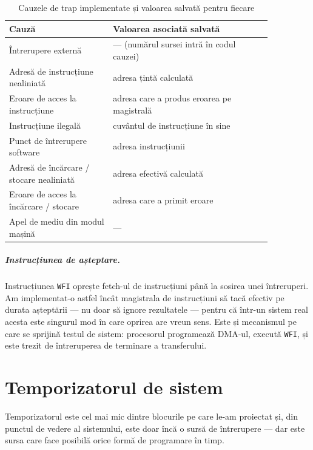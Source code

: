 \documentclass[11pt,openany]{report}
\newcommand{\sig}[1]{\texttt{#1}}
\begin{document}
\begin{table}[H]
\centering
\caption{Cauzele de trap implementate și valoarea salvată pentru fiecare}
\label{tab:trapcauses}
\small
\begin{tabular}{@{}L{0.34\linewidth}L{0.52\linewidth}@{}}
\toprule
\textbf{Cauză} & \textbf{Valoarea asociată salvată} \\
\midrule
Întrerupere externă & --- (numărul sursei intră în codul cauzei) \\
Adresă de instrucțiune nealiniată & adresa țintă calculată \\
Eroare de acces la instrucțiune & adresa care a produs eroarea pe magistrală \\
Instrucțiune ilegală & cuvântul de instrucțiune în sine \\
Punct de întrerupere software & adresa instrucțiunii \\
Adresă de încărcare / stocare nealiniată & adresa efectivă calculată \\
Eroare de acces la încărcare / stocare & adresa care a primit eroare \\
Apel de mediu din modul mașină & --- \\
\bottomrule
\end{tabular}
\end{table}

\paragraph{Instrucțiunea de așteptare.} Instrucțiunea \sig{WFI} oprește
fetch-ul de instrucțiuni până la sosirea unei întreruperi. Am implementat-o
astfel încât magistrala de instrucțiuni să tacă efectiv pe durata așteptării ---
nu doar să ignore rezultatele --- pentru că într-un sistem real acesta este
singurul mod în care oprirea are vreun sens. Este și mecanismul pe care se
sprijină testul de sistem: procesorul programează DMA-ul, execută \sig{WFI}, și
este trezit de întreruperea de terminare a transferului.

\chapter{Temporizatorul de sistem}
\label{ch:mtimer}

Temporizatorul este cel mai mic dintre blocurile pe care le-am proiectat și,
din punctul de vedere al sistemului, este doar încă o sursă de întrerupere ---
dar este sursa care face posibilă orice formă de programare în timp.
\end{document}
